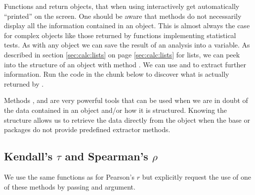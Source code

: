 \documentclass[krantz2]{krantz}\usepackage{knitr}%
\begin{document}
\begin{playground}
Functions  and  return \Rlang objects, that when using \Rlang interactively get automatically ``printed'' on the screen. One should be aware that  methods do not necessarily display all the information contained in an \Rlang object. This is almost always the case for complex objects like those returned by \Rlang functions implementing statistical tests. As with any \Rlang object we can save the result of an analysis into a variable. As described in section \ref{sec:calc:lists} on page \ref{sec:calc:lists} for lists, we can peek into the structure of an object with method . We can use  and  to extract further information. Run the code in the chunk below to discover what is actually returned by .

\begin{knitrout}\footnotesize
{}\color{fgcolor}\begin{kframe}
\begin{alltt}
 \hlkwb{<-} 
\end{alltt}
\end{kframe}
\end{knitrout}

Methods ,  and  are very powerful tools that can be used when we are in doubt of the data contained in an object and/or how it is structured. Knowing the structure allows us to retrieve the data directly from the object when the base \Rlang or packages do not provide predefined extractor methods.
\end{playground}

\subsection{Kendall's $\tau$ and Spearman's $\rho$}

We use the same functions as for Pearson's $r$ but explicitly request the use of one of these methods by passing and argument.
\end{document}
